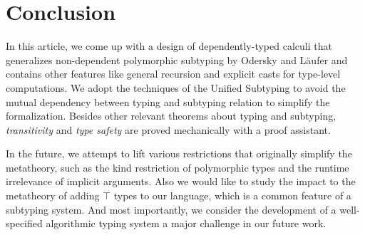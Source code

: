 \section{Conclusion}

In this article, we come up with a design of dependently-typed calculi \name
that generalizes non-dependent polymorphic subtyping by Odersky and
L\"aufer\cite{odersky1996putting} and contains other features like general
recursion and explicit casts for type-level computations.
We adopt the techniques of the Unified Subtyping\cite{yang2017unifying} to
avoid the mutual dependency between typing and subtyping relation to simplify
the formalization. Besides other relevant theorems about typing and subtyping,
\emph{transitivity} and \emph{type safety} are proved mechanically with a proof assistant.

In the future, we attempt to lift various restrictions that originally simplify
the metatheory, such as the kind restriction of polymorphic
types and the runtime irrelevance of implicit arguments. Also we would like to
study the impact to the metatheory of adding $\top$ types to our language,
which is a common feature of a subtyping system.
And most importantly, we consider the development
of a well-specified algorithmic typing system a major challenge in our future
work.